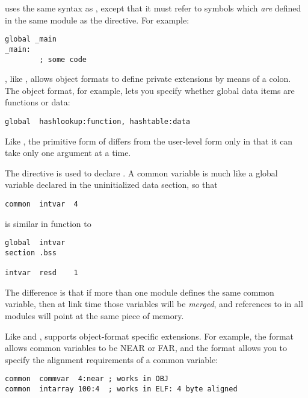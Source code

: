  uses the same syntax as , except that it must
refer to symbols which \emph{are} defined in the same module as the
 directive. For example:

\begin{lstlisting}
global _main
_main:
        ; some code
\end{lstlisting}

, like , allows object formats to define private
extensions by means of a colon. The  object format, for
example, lets you specify whether global data items are functions or
data:

\begin{lstlisting}
global  hashlookup:function, hashtable:data
\end{lstlisting}

Like , the primitive form of  differs
from the user-level form only in that it can take only one argument
at a time.


The  directive is used to declare . A common variable is much like a global variable declared
in the uninitialized data section, so that

\begin{lstlisting}
common  intvar  4
\end{lstlisting}

is similar in function to

\begin{lstlisting}
global  intvar
section .bss

intvar  resd    1
\end{lstlisting}

The difference is that if more than one module defines the same
common variable, then at link time those variables will be
\emph{merged}, and references to  in all modules
will point at the same piece of memory.

Like  and ,  supports
object-format specific extensions. For example, the 
format allows common variables to be NEAR or FAR, and the 
format allows you to specify the alignment requirements of
a common variable:

\begin{lstlisting}
common  commvar  4:near ; works in OBJ
common  intarray 100:4  ; works in ELF: 4 byte aligned
\end{lstlisting}

